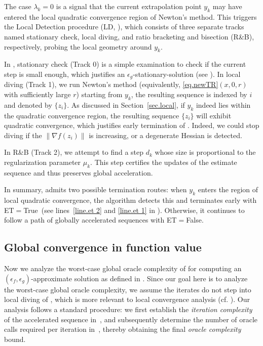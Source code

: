 \documentclass{article}
\numberwithin{equation}{section}
\numberwithin{equation}{section}
\begin{document}
The case $\lambda_k = 0$ is a signal that the current extrapolation point $y_k$ may have entered the local quadratic convergence region of Newton's method. This triggers the Local Detection procedure (LD, ), which consists of three separate tracks named stationary check, local diving, and ratio bracketing and bisection (R\&B), respectively, probing the local geometry around $y_k$.

In , stationary check ({Track 0}) is a simple examination to check if the current step is small enough, which justifies an $\epsilon_g$-stationary-solution (see ).
In local diving ({Track 1}), we run Newton's method (equivalently, \ref{eq.newTR}$(x, 0, r)$ with sufficiently large $r$) starting from $y_k$, the resulting sequence is indexed by $i$ and denoted by $\{z_i\}$. As discussed in Section~\ref{sec.local}, if $y_k$ indeed lies within the quadratic convergence region, the resulting sequence $\{z_i\}$ will exhibit quadratic convergence, which justifies early termination of . Indeed, we could stop diving if the $\|\nabla f(z_i)\|$ is increasing, or a degenerate Hessian is detected.

In R\&B ({Track 2}), we attempt to find a step $d_k$ whose size is proportional to the regularization parameter $\mu_k$. This step certifies the updates of the estimate sequence and thus preserves global acceleration.

In summary,  admits two possible termination routes: when $y_k$ enters the region of local quadratic convergence, the algorithm detects this and terminates early with ET$=$True~(see lines~\ref{line.et 2} and \ref{line.et 1} in ). Otherwise, it continues to follow a path of globally accelerated sequences with ET$=$False.

\subsection{Global convergence in function value}
Now we analyze the worst-case global oracle complexity of  for computing an $(\epsilon_f,\epsilon_g)$-approximate solution as defined in . Since our goal here is to analyze the worst-case global oracle complexity, we assume the iterates do not step into local diving of , which is more relevant to local convergence analysis (cf. ). Our analysis follows a standard procedure: we first establish the \textit{iteration complexity} of the accelerated sequence in~, and subsequently determine the number of oracle calls required per iteration in~, thereby obtaining the final \textit{oracle complexity} bound.
\end{document}
